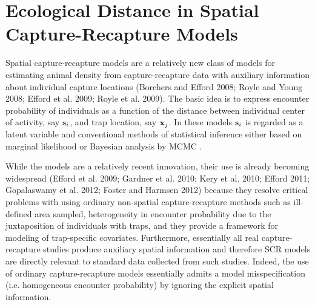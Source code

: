 \chapter{
Ecological Distance in Spatial Capture-Recapture Models
}
\label{chapt.implicit}


\vspace{.3in}


Spatial capture-recapture models are a relatively new class of models
for estimating animal density from capture-recapture data with
auxiliary information about individual capture locations (Borchers and
Efford 2008; Royle and Young 2008; Efford et al. 2009; Royle et
al. 2009).  The basic idea is to express encounter probability of
individuals as a function of the distance between individual center of
activity, say ${\bf s}_{i}$, and trap location, say ${\bf x}_{j}$.  In
these models ${\bf s}_{i}$ is regarded as a latent variable and
conventional methods of statistical inference either based on marginal
likelihood \citep{borchers_efford:2008} or Bayesian analysis by MCMC
\citep{royle_young:2008}.

While the models are a relatively recent innovation, their use is
already becoming widespread (Efford et al. 2009; Gardner et al. 2010;
Kery et al. 2010; Efford 2011; Gopalaswamy et al. 2012; Foster and
Harmsen 2012) because they resolve critical problems with using
ordinary non-spatial capture-recapture methods such as ill-defined
area sampled, heterogeneity in encounter probability due to the
juxtaposition of individuals with traps, and they provide a framework
for modeling of trap-specific covariates.  Furthermore, essentially
all real capture-recapture studies produce auxiliary spatial
information and therefore SCR models are directly relevant to standard
data collected from such studies. Indeed, the use of ordinary
capture-recapture models essentially admits a model misspecification
(i.e. homogeneous encounter probability) by ignoring the explicit
spatial information.

